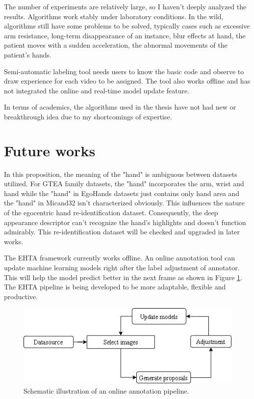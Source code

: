 The number of experiments are relatively large, so I haven’t deeply analyzed the results. Algorithms work stably under laboratory conditions. In the wild, algorithms still have some problems to be solved, typically cases such as excessive arm resistance, long-term disappearance of an instance, blur effects at hand, the patient moves with a sudden acceleration, the abnormal movements of the patient’s hands.

Semi-automatic labeling tool needs users to know the basic code and observe to draw experience for each video to be assigned. The tool also works offline and has not integrated the online and real-time model update feature.

In terms of academics, the algorithms used in the thesis have not had new or breakthrough idea due to my shortcomings of expertise.
\section{Future works} \label{sec:futurework}
In this proposition, the meaning of the "hand" is ambiguous between datasets utilized. For GTEA family datasets, the "hand" incorporates the arm, wrist and hand while the "hand" in EgoHands datasets just contains only hand area and the "hand" in Micand32 isn't characterized obviously. This influences the nature of the egocentric hand re-identification dataset. Consequently, the deep appearance descriptor can't recognize the hand's highlights and doesn't function admirably. This re-identification dataset will be checked and upgraded in later works.

The EHTA framework currently works offline. An online annotation tool can update machine learning models right after the label adjustment of annotator. This will help the model predict better in the next frame as shown in Figure \ref{fig:future}. The EHTA pipeline is being developed to be more adaptable, flexible and productive. 
\begin{figure}[htbp]
	\centerline{\includegraphics[width=0.5\textheight]{Figs/future.png}}
	\caption{Schematic illustration of an online annotation pipeline.}
	\label{fig:future}
\end{figure}

